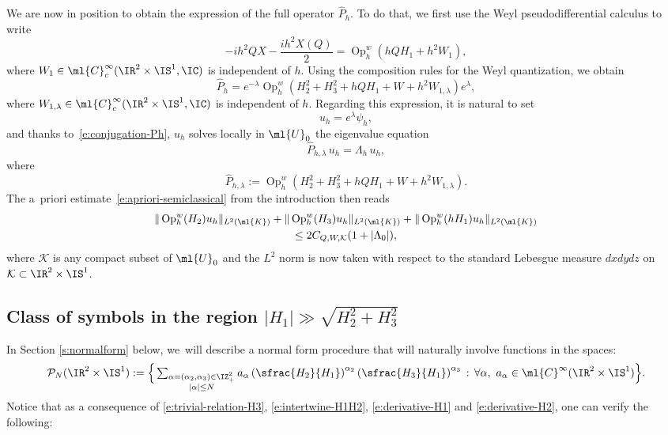 \documentclass[JEP,XML,SOM,Unicode, NoEqCountersInSection,published]{cedram}
\theoremstyle{plain}
\theoremstyle{definition}
\theoremstyle{remark}
\newcommand{\Op}{\operatorname{Op}}
\begin{document}
We are now in position to obtain the expression of the full operator $\widehat{P}_h$. To do that, we first use the Weyl pseudodifferential calculus to write
\[
-ih^2QX -\frac{ih^2X(Q)}{2}=\Op_h^w(hQH_1+h^2W_1),
\]
where $W_1\in\ml{C}^{\infty}_c(\IR^2\times\IS^1,\IC)$ is independent of $h$. Using the composition rules for the Weyl quantization, we obtain
\begin{equation}\label{e:conjugation-Ph}
\widehat{P}_h= e^{-\lambda}\Op_h^w(H_2^2+H_3^2+hQH_1+W+h^2W_{1,\lambda}) e^{\lambda},
\end{equation}
where $W_{1,\lambda}\in\ml{C}^{\infty}_c(\IR^2\times\IS^1,\IC)$ is independent of $h$. Regarding this expression, it is natural to set
\begin{equation}\label{e:conjugated-eigenfunction}
u_h=e^{\lambda}\psi_h,
\end{equation}
and thanks to~\eqref{e:conjugation-Ph}, $u_h$ solves locally in $\ml{U}_0$ the eigenvalue equation
\begin{equation}\label{e:eigenvalue-conjugation}
\widehat{P}_{h,\lambda} \, u_h=\Lambda_h \, u_h,
\end{equation}
where
\[
\widehat{P}_{h,\lambda}:=\Op_h^w(H_2^2+H_3^2+hQH_1+W+h^2W_{1,\lambda}).
\]
The a~priori estimate~\eqref{e:apriori-semiclassical} from the introduction then reads
\begin{multline}\label{e:apriori-semiclassical1}
\|\Op_h^w(H_2)u_h\|_{L^2(\ml{K})}+\|\Op_h^w(H_3)u_h\|_{L^2(\ml{K})}+\|\Op_h^w(hH_1)u_h\|_{L^2(\ml{K})}\\
\leq 2C_{Q,W,\mathcal{K}}(1+|\Lambda_0|),
\end{multline}
where $\mathcal{K}$ is any compact subset of $\ml{U}_0$ and the $L^2$ norm is now taken with respect to the standard Lebesgue measure $dxdydz$ on $\mathcal{K}\subset \IR^2\times\IS^1$.

\subsection{Class of symbols in the region $|H_1|\gg\sqrt{H_2^2+H_3^2}$}\label{ss:polynomialsymbols}

In Section \ref{s:normalform} below, we~will describe a normal form procedure that will naturally involve functions in the spaces:
\[\textstyle
\mathcal{P}_N(\IR^2\times\IS^1):=\Big \{\sum_{\substack{\alpha=(\alpha_2,\alpha_3)\in\IZ_+^2 \\ |\alpha|\leq N}} a_{\alpha}\left(\sfrac{H_2}{H_1}\right)^{\alpha_2}\left(\sfrac{H_3}{H_1}\right)^{\alpha_3} \, : \,\forall\alpha,\ a_\alpha\in\ml{C}^{\infty}(\IR^2\times\IS^1)\Big \}.
\]
Notice that as a consequence of \eqref{e:trivial-relation-H3}, \eqref{e:intertwine-H1H2}, \eqref{e:derivative-H1} and \eqref{e:derivative-H2}, one can verify the following:
\end{document}
